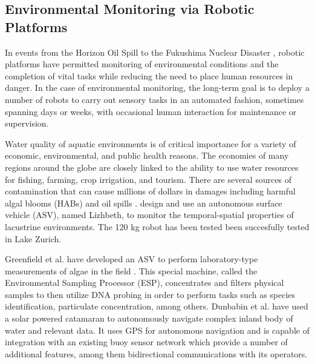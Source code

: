	\subsection{Environmental Monitoring via Robotic Platforms}%

		In events from the Horizon Oil Spill \cite{dssoa} to the Fukushima Nuclear Disaster \cite{Hasegawa2012}, robotic platforms have permitted monitoring of environmental conditions and the completion of vital tasks while reducing the need to place human resources in danger. In the case of environmental monitoring, the long-term goal is to deploy a number of robots to carry out sensory tasks in an automated fashion, sometimes spanning days or weeks, with occasional human interaction for maintenance or supervision.

		Water quality of aquatic environments is of critical importance for a variety of economic, environmental, and public health reasons. The economies of many regions around the globe are closely linked to the ability to use water resources for fishing, farming, crop irrigation, and tourism. There are several sources of contamination that can cause millions of dollars in damages including harmful algal blooms (HABs) and oil spills \cite{EPA2015a}. \cite{Hitz2012} design and use an autonomous surface vehicle (ASV), named Lizhbeth,  to monitor the temporal-spatial properties of lacustrine environments. The 120 kg robot has been tested been succesfully tested in Lake Zurich. 

		Greenfield et al. have developed an ASV to perform laboratory-type measurements of algae in the field \cite{Greenfield2008}. This special machine, called the Environmental Sampling Processor (ESP), concentrates and filters physical samples to then utilize DNA probing in order to perform tasks such as species identification, particulate concentration, among others. Dunbabin et al. \cite{Dunbabin2009} have used a solar powered catamaran to autonomously navigate complex inland body of water and relevant data. It uses GPS for autonomous navigation and is capable of integration with an existing buoy sensor network which provide a number of additional features, among them bidirectional communications with its operators.  

